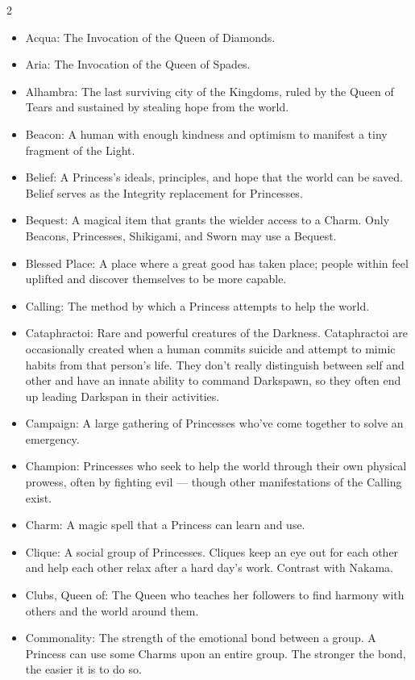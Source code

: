 \begin{multicols}{2}
\begin{itemize}
  \item Acqua: The Invocation of the Queen of Diamonds.
  \item Aria: The Invocation of the Queen of Spades.
  \item Alhambra: The last surviving city of the Kingdoms, ruled by the Queen of Tears and sustained by stealing hope from the world. 
  \item Beacon: A human with enough kindness and optimism to manifest a tiny fragment of the Light.
  \item Belief: A Princess's ideals, principles, and hope that the world can be saved. Belief serves as the Integrity replacement for Princesses. 
  \item Bequest: A magical item that grants the wielder access to a Charm. Only Beacons, Princesses, Shikigami, and Sworn may use a Bequest. 
  \item Blessed Place: A place where a great good has taken place; people within feel uplifted and discover themselves to be more capable. 
  \item Calling: The method by which a Princess attempts to help the world. 
  \item Cataphractoi: Rare and powerful creatures of the Darkness. Cataphractoi are occasionally created when a human commits suicide and attempt to mimic habits from that person's life. They don't really distinguish between self and other and have an innate ability to command Darkspawn, so they often end up leading Darkspan in their activities. 
  \item Campaign: A large gathering of Princesses who've come together to solve an emergency. 
  \item Champion: Princesses who seek to help the world through their own physical prowess, often by fighting evil — though other manifestations of the Calling exist. 
  \item Charm: A magic spell that a Princess can learn and use. 
  \item Clique: A social group of Princesses. Cliques keep an eye out for each other and help each other relax after a hard day's work. Contrast with Nakama.
  \item Clubs, Queen of: The Queen who teaches her followers to find harmony with others and the world around them.
  \item Commonality: The strength of the emotional bond between a group. A Princess can use some Charms upon an entire group. The stronger the bond, the easier it is to do so. 

\end{itemize}
\end{multicols}
